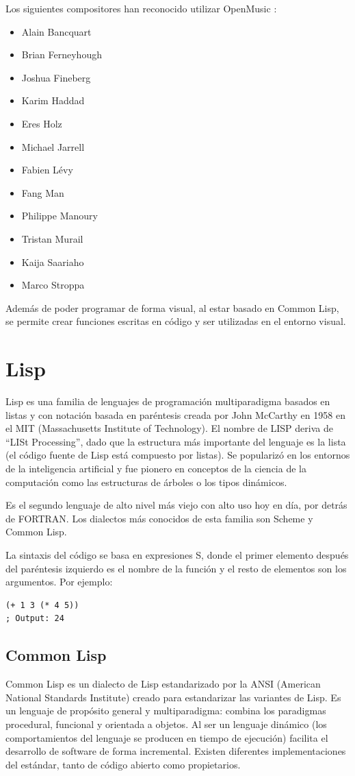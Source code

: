 \documentclass[a4paper,openany,oneside,12pt]{book}
\begin{document}
Los siguientes compositores han reconocido utilizar OpenMusic \cite{wiki:openmusic}:

\begin{itemize}
\item Alain Bancquart
\item Brian Ferneyhough
\item Joshua Fineberg
\item Karim Haddad
\item Eres Holz
\item Michael Jarrell
\item Fabien Lévy
\item Fang Man
\item Philippe Manoury
\item Tristan Murail
\item Kaija Saariaho
\item Marco Stroppa
\end{itemize}

Además de poder programar de forma visual, al estar basado en Common Lisp, se permite crear funciones escritas en código y ser utilizadas en el entorno visual.
\section{Lisp}
Lisp es una familia de lenguajes de programación multiparadigma basados en listas y con notación basada en paréntesis creada por John McCarthy en 1958 en el MIT (Massachusetts Institute of Technology). El nombre de LISP deriva de ``LISt Processing'', dado que la estructura más importante del lenguaje es la lista (el código fuente de Lisp está compuesto por listas).\cite{wiki:lisp} Se popularizó en los entornos de la inteligencia artificial y fue pionero en conceptos de la ciencia de la computación como las estructuras de árboles o los tipos dinámicos.

Es el segundo lenguaje de alto nivel más viejo con alto uso hoy en día, por detrás de FORTRAN. Los dialectos más conocidos de esta familia son Scheme y Common Lisp.

La sintaxis del código se basa en expresiones S, donde el primer elemento después del paréntesis izquierdo es el nombre de la función y el resto de elementos son los argumentos. Por ejemplo:

\lstset{language=Lisp}
\begin{lstlisting}
(+ 1 3 (* 4 5))
; Output: 24
\end{lstlisting}


\subsection{Common Lisp}
Common Lisp es un dialecto de Lisp estandarizado por la ANSI (American National Standards Institute) creado para estandarizar las variantes de Lisp. Es un lenguaje de propósito general y multiparadigma: combina los paradigmas procedural, funcional y orientada a objetos. Al ser un lenguaje dinámico (los comportamientos del lenguaje se producen en tiempo de ejecución) facilita el desarrollo de software de forma incremental. Existen diferentes implementaciones del estándar, tanto de código abierto como propietarios. \cite{wiki:commonlisp} 
\end{document}

